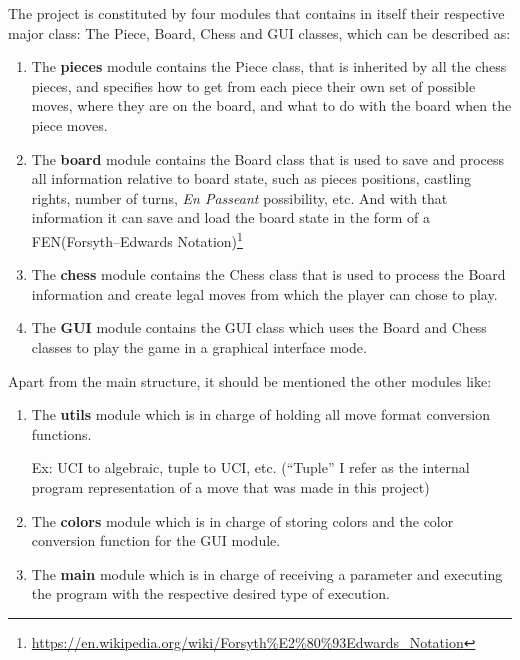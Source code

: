 \documentclass[10pt]{article}
\begin{document}
The project is constituted by four modules that contains in itself their
respective major class: The Piece, Board, Chess and GUI classes, which can be
described as:
\begin{enumerate}[label=\alph*)]
    \item The \textbf{pieces} module contains the Piece class, that is inherited by all
        the chess pieces, and specifies how to get from each piece their own set
        of possible moves, where they are on the board, and what to do with
        the board when the piece moves.
    \item The \textbf{board} module contains the Board class that is used to save and
            process all
            information relative to board state, such as pieces positions,
            castling rights, number of turns, \textit{En Passeant} possibility, etc.
            And with that information it can save and load the board state
            in the form of a FEN(Forsyth–Edwards
            Notation)\footnote{\url{https://en.wikipedia.org/wiki/Forsyth\%E2\%80\%93Edwards_Notation}}
        \item The \textbf{chess} module contains the Chess class that is used to process
            the Board information and create legal moves from which the player
            can chose to play.
        \item The \textbf{GUI} module contains the GUI class which uses the Board and Chess classes to play the game in a graphical interface mode.
\end{enumerate}

Apart from the main structure, it should be mentioned the other modules like:

\begin{enumerate}[label=\alph*)]
\item The \textbf{utils} module which is in charge of holding all move format
    conversion functions.

    Ex: UCI to algebraic, tuple to UCI, etc. (``Tuple'' I refer as the internal
    program representation of a move that was made in this project)

    \item The \textbf{colors} module which is in charge of storing colors and
        the color
    conversion function for the GUI module.

    \item The \textbf{main} module which is in charge of receiving a parameter and
        executing the program with the respective desired type of execution.

\end{enumerate}
\end{document}
